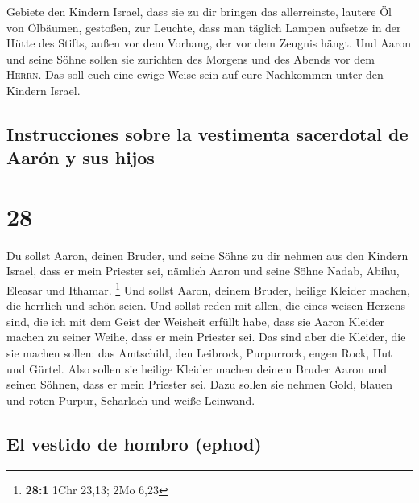  Gebiete den Kindern Israel, dass sie zu dir bringen das
allerreinste, lautere Öl von Ölbäumen, gestoßen, zur Leuchte, dass man
täglich Lampen aufsetze  in der Hütte des Stifts, außen
vor dem Vorhang, der vor dem Zeugnis hängt. Und Aaron und seine Söhne
sollen sie zurichten des Morgens und des Abends vor dem \textsc{Herrn}.
Das soll euch eine ewige Weise sein auf eure Nachkommen unter den
Kindern Israel.

\hypertarget{instrucciones-sobre-la-vestimenta-sacerdotal-de-aaruxf3n-y-sus-hijos}{%
\subsection{Instrucciones sobre la vestimenta sacerdotal de Aarón y sus
hijos}\label{instrucciones-sobre-la-vestimenta-sacerdotal-de-aaruxf3n-y-sus-hijos}}

\hypertarget{section-27}{%
\section{28}\label{section-27}}

 Du sollst Aaron, deinen Bruder, und seine Söhne zu dir
nehmen aus den Kindern Israel, dass er mein Priester sei, nämlich Aaron
und seine Söhne Nadab, Abihu, Eleasar und Ithamar. \footnote{\textbf{28:1}
  1Chr 23,13; 2Mo 6,23}  Und sollst Aaron, deinem Bruder,
heilige Kleider machen, die herrlich und schön seien.  Und
sollst reden mit allen, die eines weisen Herzens sind, die ich mit dem
Geist der Weisheit erfüllt habe, dass sie Aaron Kleider machen zu seiner
Weihe, dass er mein Priester sei.  Das sind aber die
Kleider, die sie machen sollen: das Amtschild, den Leibrock, Purpurrock,
engen Rock, Hut und Gürtel. Also sollen sie heilige Kleider machen
deinem Bruder Aaron und seinen Söhnen, dass er mein Priester sei.
 Dazu sollen sie nehmen Gold, blauen und roten Purpur,
Scharlach und weiße Leinwand.

\hypertarget{el-vestido-de-hombro-ephod}{%
\subsection{El vestido de hombro
(ephod)}\label{el-vestido-de-hombro-ephod}}

